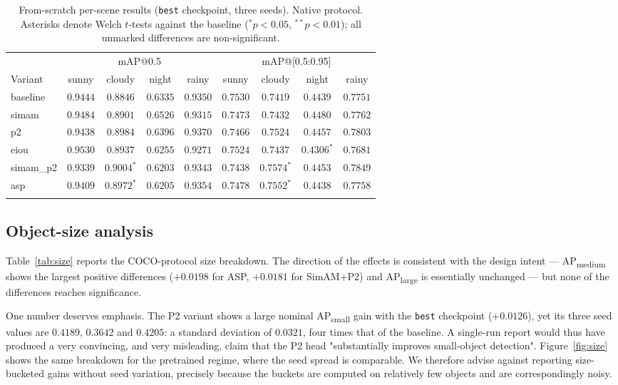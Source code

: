 \documentclass[pdflatex,sn-basic,Numbered]{sn-jnl}%
\begin{document}
\begin{table}[t]
\caption{From-scratch per-scene results (\texttt{best} checkpoint, three seeds). Native protocol. Asterisks denote Welch $t$-tests against the baseline ($^{*}p<0.05$, $^{**}p<0.01$); all unmarked differences are non-significant.}\label{tab:scenes}%
\centering
\begin{adjustbox}{max width=\textwidth}
\begin{tabular}{@{}lcccccccc@{}}
\toprule
& \multicolumn{4}{c}{mAP@0.5} & \multicolumn{4}{c}{mAP@[0.5:0.95]}\\
\cmidrule(lr){2-5}\cmidrule(lr){6-9}
Variant & sunny & cloudy & night & rainy & sunny & cloudy & night & rainy\\
\midrule
baseline  & $0.9444$ & $0.8846$ & $0.6335$ & $0.9350$ & $0.7530$ & $0.7419$ & $0.4439$ & $0.7751$\\
simam     & $0.9484$ & $0.8901$ & $\mathbf{0.6526}$ & $0.9315$ & $0.7473$ & $0.7432$ & $0.4480$ & $0.7762$\\
p2        & $0.9438$ & $0.8984$ & $0.6396$ & $0.9370$ & $0.7466$ & $0.7524$ & $0.4457$ & $0.7803$\\
eiou      & $\mathbf{0.9530}$ & $0.8937$ & $0.6255$ & $0.9271$ & $0.7524$ & $0.7437$ & $0.4306^{*}$ & $0.7681$\\
simam\_p2 & $0.9339$ & $\mathbf{0.9004^{*}}$ & $0.6203$ & $0.9343$ & $0.7438$ & $\mathbf{0.7574^{*}}$ & $0.4453$ & $\mathbf{0.7849}$\\
asp       & $0.9409$ & $0.8972^{*}$ & $0.6205$ & $0.9354$ & $0.7478$ & $0.7552^{*}$ & $0.4438$ & $0.7758$\\
\botrule
\end{tabular}
\end{adjustbox}
\end{table}

\subsection{Object-size analysis}\label{sec:size}

Table~\ref{tab:size} reports the COCO-protocol size breakdown. The direction of the effects is consistent with the design intent --- AP\textsubscript{medium} shows the largest positive differences ($+0.0198$ for ASP, $+0.0181$ for SimAM+P2) and AP\textsubscript{large} is essentially unchanged --- but none of the differences reaches significance.

One number deserves emphasis. The P2 variant shows a large nominal AP\textsubscript{small} gain with the \texttt{best} checkpoint ($+0.0126$), yet its three seed values are $0.4189$, $0.3642$ and $0.4205$: a standard deviation of $0.0321$, four times that of the baseline. A single-run report would thus have produced a very convincing, and very misleading, claim that the P2 head "substantially improves small-object detection". Figure~\ref{fig:size} shows the same breakdown for the pretrained regime, where the seed spread is comparable. We therefore advise against reporting size-bucketed gains without seed variation, precisely because the buckets are computed on relatively few objects and are correspondingly noisy.
\end{document}
